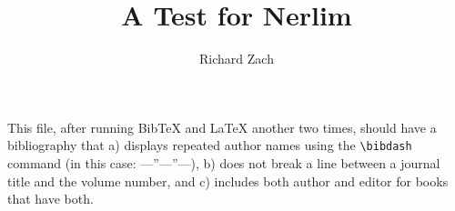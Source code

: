 \documentclass{article}
\title{A Test for Nerlim}
\author{Richard Zach}
\newcommand{\bibdash}{---''---''---}
\begin{document}
\maketitle

This file, after running Bib\TeX{} and \LaTeX{} another two times, should have a bibliography that a) displays repeated author names using the \verb|\bibdash| command (in this case: \bibdash), b) does not break a line between a journal title and the volume number, and c) includes both author and editor for books that have both.


\cite{*}

\end{document}
